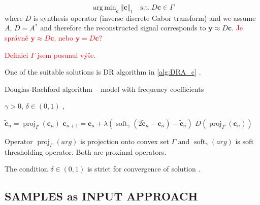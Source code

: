\documentclass[conference]{IEEEtran}
\newcommand{\todo}[1]{\textcolor{red}{#1}}
\begin{document}
\begin{equation}
 \mathop {\operatorname{arg \, min}}_\mathbf {c}\Vert \mathbf {c}\Vert _1 \quad \text{s.t.}\ D\mathbf {c}\in \Gamma
\end{equation} 
where $ D $ is synthesis operator (inverse discrete Gabor transform) and we assume $ A $, $ D = A^* $ and therefore the reconstructed signal corresponds to $ \mathbf {y} \approx  D\mathbf {c}$.
\todo{Je správně $ \mathbf {y} \approx  D\mathbf {c}$, nebo $ \mathbf {y} =  D\mathbf {c}$?}

\todo{Definici $\Gamma$ jsem posunul výše.}


One of the suitable solutions is DR algorithm in \ref{alg:DRA_c} \cite{Mokry2020}.

\begin{algorithm}
	\caption{Douglas-Rachford algorithm -- model with frequency coefficients}
	\begin{algorithmic}[1]\label{alg:DRA_c}
		\renewcommand{\algorithmicrequire}{\textbf{Input:}}
		\renewcommand{\algorithmicensure}{\textbf{Output:}}
		\REQUIRE  $ \gamma > 0 $, $ \delta  \in (0,1)$ ,
		
		\STATE $\mathbf{\widetilde{c}}_n=\operatorname{proj}_{\Gamma}(\mathbf{c}_n) $ 
		\STATE $ \mathbf{c}_{n+1} = \mathbf{c}_n + \lambda \left( \operatorname{soft}_{\gamma}\left(2\mathbf{\widetilde{c}}_n-\mathbf{c}_n \right)-\mathbf{\widetilde{c}}_n\right)$
		\ENDFOR
		\RETURN $D(\operatorname{proj}_{\Gamma}(\mathbf{c}_n))$ 
	\end{algorithmic} 
\end{algorithm}
Operator $ \operatorname{proj}_{\Gamma}(arg)$ is projection onto convex set $ \Gamma $ and $\operatorname{soft}_{\gamma}(arg)$ is soft thresholding operator.
Both are proximal operators.

The condition   $ \delta  \in (0,1)$ is strict for convergence of solution \cite{Combettes2011}.


\subsection{SAMPLES as INPUT APPROACH}\label{subsec:timecoef}
\end{document}
